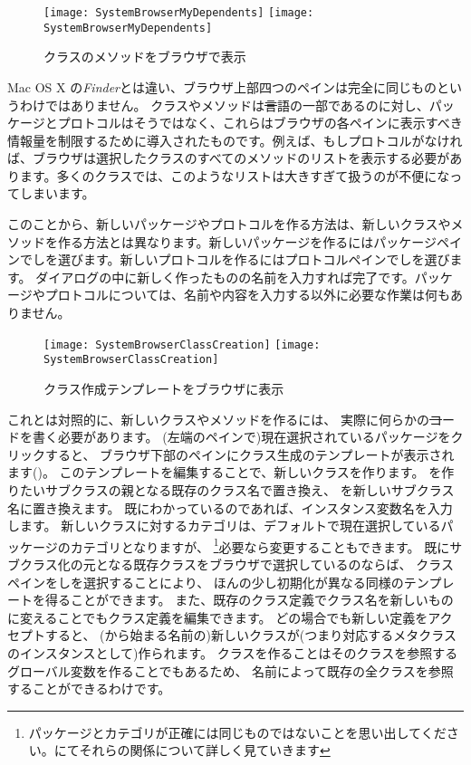 \documentclass[a4paper,10pt,twoside]{book}
\begin{document}
\begin{figure}[htbp]
   \centering
   \ifluluelse
{\texttt{[image: SystemBrowserMyDependents]}}
{\texttt{[image: SystemBrowserMyDependents]}}
   \caption{クラスのメソッドをブラウザで表示
   }
\end{figure}

Mac OS X の\emph{Finder}とは違い、ブラウザ上部四つのペインは完全に同じものというわけではありません。
クラスやメソッドは\st 言語の一部であるのに対し、パッケージとプロトコルはそうではなく、これらはブラウザの各ペインに表示すべき情報量を制限するために導入されたものです。例えば、もしプロトコルがなければ、ブラウザは選択したクラスのすべてのメソッドのリストを表示する必要があります。多くのクラスでは、このようなリストは大きすぎて扱うのが不便になってしまいます。

このことから、新しいパッケージやプロトコルを作る方法は、新しいクラスやメソッドを作る方法とは異なります。新しいパッケージを作るにはパッケージペインで\actclick しを選びます。新しいプロトコルを作るにはプロトコルペインで\actclick しを選びます。
ダイアログの中に新しく作ったものの名前を入力すれば完了です。パッケージやプロトコルについては、名前や内容を入力する以外に必要な作業は何もありません。

\begin{figure}[htbp]
   \centering
   \ifluluelse
{\texttt{[image: SystemBrowserClassCreation]}}
{\texttt{[image: SystemBrowserClassCreation]}}
   \caption{クラス作成テンプレートをブラウザに表示
   }
\end{figure}

これとは対照的に、新しいクラスやメソッドを作るには、
実際に何らかの\st コードを書く必要があります。
(左端のペインで)現在選択されているパッケージをクリックすると、
ブラウザ下部のペインにクラス生成のテンプレートが表示されます()。
このテンプレートを編集することで、新しいクラスを作ります。
を作りたいサブクラスの親となる既存のクラス名で置き換え、
を新しいサブクラス名に置き換えます。
既にわかっているのであれば、インスタンス変数名を入力します。
新しいクラスに対するカテゴリは、デフォルトで現在選択しているパッケージのカテゴリとなりますが、
\footnote{パッケージとカテゴリが正確には同じものではないことを思い出してください。にてそれらの関係について詳しく見ていきます}必要なら変更することもできます。
既にサブクラス化の元となる既存クラスをブラウザで選択しているのならば、
クラスペインを\actclick しを選択することにより、
ほんの少し初期化が異なる同様のテンプレートを得ることができます。
また、既存のクラス定義でクラス名を新しいものに変えることでもクラス定義を編集できます。
どの場合でも新しい定義をアクセプトすると、
(\ct{#}から始まる名前の)新しいクラスが(つまり対応するメタクラスのインスタンスとして)作られます。
クラスを作ることはそのクラスを参照するグローバル変数を作ることでもあるため、
名前によって既存の全クラスを参照することができるわけです。
\end{document}
